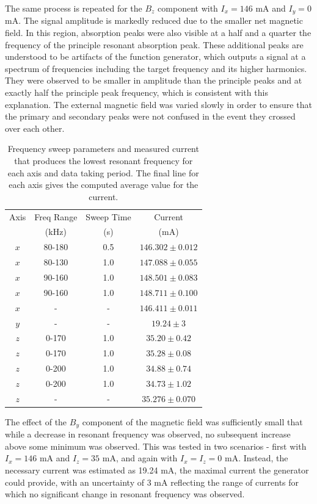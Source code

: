 The same process is repeated for the $B_z$ component with $I_x=146$ mA and $I_y=0$ mA. The signal amplitude is markedly reduced due to the smaller net magnetic field. In this region, absorption peaks were also visible at a half and a quarter the frequency of the principle resonant absorption peak. These additional peaks are understood to be artifacts of the function generator, which outputs a signal at a spectrum of frequencies including the target frequency and its higher harmonics. They were observed to be smaller in amplitude than the principle peaks and at exactly half the principle peak frequency, which is consistent with this explanation. The external magnetic field was varied slowly in order to ensure that the primary and secondary peaks were not confused in the event they crossed over each other.
\begin{table}[h]
\caption{\label{min} Frequency sweep parameters and measured current that produces the lowest resonant frequency for each axis and data taking period. The final line for each axis gives the computed average value for the current.}
\begin{tabular}{|c|c|c|c|}
\hline
Axis &Freq Range & Sweep Time &  Current \\
& (kHz)  & (s) & (mA) \\
\hline
$x$ & 80-180& 0.5 & $146.302\pm0.012$  \\
$x$ & 80-130& 1.0 & $147.088\pm0.055$ \\
$x$ & 90-160& 1.0 & $148.501\pm0.083$  \\
$x$ & 90-160& 1.0 & $148.711\pm0.100$  \\
\hline 
$x$ & - & - & $146.411\pm0.011$ \\
\hline
$y$ & - & - & $19.24\pm3$ \\
\hline
$z$ & 0-170 & 1.0 & $35.20\pm 0.42$ \\
$z$ & 0-170 & 1.0 & $35.28\pm 0.08$ \\
$z$ & 0-200 & 1.0 & $34.88\pm 0.74$ \\
$z$ & 0-200 & 1.0 & $34.73\pm 1.02$ \\
\hline
$z$ & - & - & $35.276\pm 0.070$ \\
\hline
\end{tabular}
\end{table}

The effect of the $B_y$ component of the magnetic field was sufficiently small that while a decrease in resonant frequency was observed, no subsequent increase above some minimum was observed. This was tested in two scenarios - first with $I_x=146$ mA and $I_z=35$ mA, and again with $I_x=I_z=0$ mA. Instead, the necessary current was estimated as 19.24 mA, the maximal current the generator could provide, with an uncertainty of 3 mA reflecting the range of currents for which no significant change in resonant frequency was observed. 

